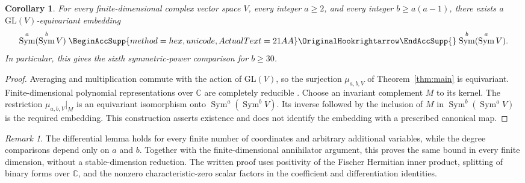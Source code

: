 \documentclass[11pt]{article}
\renewcommand{\hookrightarrow}{\mathrel{
  \BeginAccSupp{method=hex,unicode,ActualText=21AA}
  \OriginalHookrightarrow\EndAccSupp{}}}
\newtheorem{corollary}[theorem]{Corollary}
\theoremstyle{remark}
\newtheorem{remark}[theorem]{Remark}
\DeclareMathOperator{\Sym}{Sym}
\newcommand{\C}{\mathbb C}
\begin{document}
\begin{corollary}\label{cor:comparison}
For every finite-dimensional complex vector space $V$, every integer
$a\ge2$, and every integer $b\ge a(a-1)$, there exists a
$\mathrm{GL}(V)$-equivariant embedding
\[
 \Sym^a(\Sym^b V)\hookrightarrow\Sym^b(\Sym^a V).
\]
In particular, this gives the sixth symmetric-power comparison for $b\ge30$.
\end{corollary}

\begin{proof}
Averaging and multiplication commute with the action of $\mathrm{GL}(V)$,
so the surjection $\mu_{a,b,V}$ of Theorem~\ref{thm:main} is equivariant.
Finite-dimensional polynomial representations over $\C$ are completely
reducible \cite[Chapter~I, Appendix~A, Sections~7--8]{Macdonald}.
Choose an invariant complement $M$ to its kernel. The restriction
$\mu_{a,b,V}|_M$ is an equivariant isomorphism onto
$\Sym^a(\Sym^b V)$. Its inverse followed by the inclusion of $M$ in
$\Sym^b(\Sym^a V)$ is the required embedding. This construction asserts
existence and does not identify the embedding with a prescribed canonical map.
\end{proof}

\begin{remark}
The differential lemma holds for every finite number of coordinates and
arbitrary additional variables, while the degree comparisons depend only
on $a$ and $b$. Together with the finite-dimensional annihilator argument,
this proves the same bound in every finite dimension, without a
stable-dimension reduction. The written proof uses positivity of the
Fischer Hermitian inner product, splitting of binary forms over $\C$, and
the nonzero characteristic-zero scalar factors in the coefficient and
differentiation identities.
\end{remark}
\end{document}
